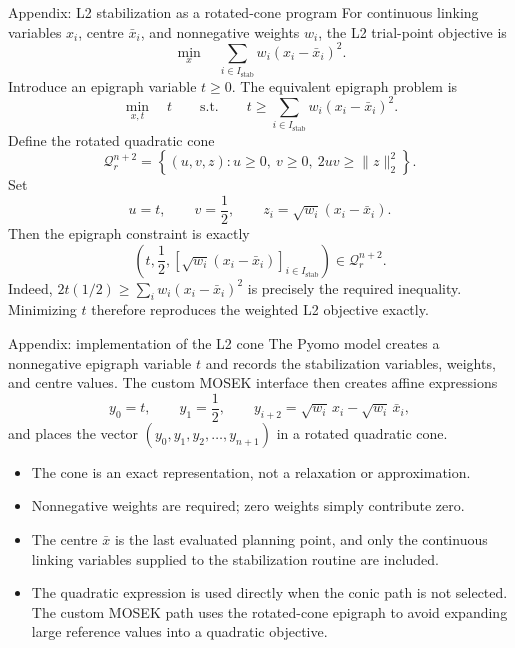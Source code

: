 \documentclass[aspectratio=169,10pt]{beamer}
\begin{document}
\begin{frame}{Appendix: L2 stabilization as a rotated-cone program}
\small
For continuous linking variables $x_i$, centre $\bar x_i$, and nonnegative weights $w_i$, the L2 trial-point objective is
\[
\min_x\quad \sum_{i\in I_{\mathrm{stab}}}w_i(x_i-\bar x_i)^2.
\]
Introduce an epigraph variable $t\geq0$. The equivalent epigraph problem is
\[
\min_{x,t}\quad t
\qquad\text{s.t.}\qquad
t\geq\sum_{i\in I_{\mathrm{stab}}}w_i(x_i-\bar x_i)^2.
\]
Define the rotated quadratic cone
\[
\mathcal Q_r^{n+2}
=
\left\{(u,v,z):
u\geq0,\ v\geq0,\ 2uv\geq\|z\|_2^2
\right\}.
\]
Set
\[
u=t,\qquad v=\frac12,\qquad
z_i=\sqrt{w_i}(x_i-\bar x_i).
\]
Then the epigraph constraint is exactly
\[
\boxed{\left(t,\frac12,
\left[\sqrt{w_i}(x_i-\bar x_i)\right]_{i\in I_{\mathrm{stab}}}
\right)\in\mathcal Q_r^{n+2}.}
\]
Indeed, $2t(1/2)\geq\sum_iw_i(x_i-\bar x_i)^2$ is precisely the required inequality. Minimizing $t$ therefore reproduces the weighted L2 objective exactly.
\end{frame}

\begin{frame}{Appendix: implementation of the L2 cone}
\small
The Pyomo model creates a nonnegative epigraph variable $t$ and records the stabilization variables, weights, and centre values. The custom MOSEK interface then creates affine expressions
\[
y_0=t,\qquad y_1=\frac12,\qquad
y_{i+2}=\sqrt{w_i}\,x_i-\sqrt{w_i}\,\bar x_i,
\]
and places the vector $(y_0,y_1,y_2,\ldots,y_{n+1})$ in a rotated quadratic cone.

\begin{itemize}
\item The cone is an exact representation, not a relaxation or approximation.
\item Nonnegative weights are required; zero weights simply contribute zero.
\item The centre $\bar x$ is the last evaluated planning point, and only the continuous linking variables supplied to the stabilization routine are included.
\item The quadratic expression is used directly when the conic path is not selected. The custom MOSEK path uses the rotated-cone epigraph to avoid expanding large reference values into a quadratic objective.
\end{itemize}
\end{frame}
\end{document}
